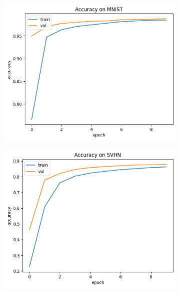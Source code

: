 \begin{figure}
	\centering
	\begin{subfigure}{0.3\textwidth}
		\centering
		\includegraphics[width=\textwidth]{Bilder/mnist-results-local.png}
		\caption{}
	\end{subfigure}
	\begin{subfigure}{0.3\textwidth}
		\centering
		\includegraphics[width=\textwidth]{Bilder/svhn-results-local.png}
		\caption{}
	\end{subfigure}
	\begin{subfigure}{0.3\textwidth}
		\centering

\end{subfigure}
\end{figure}
